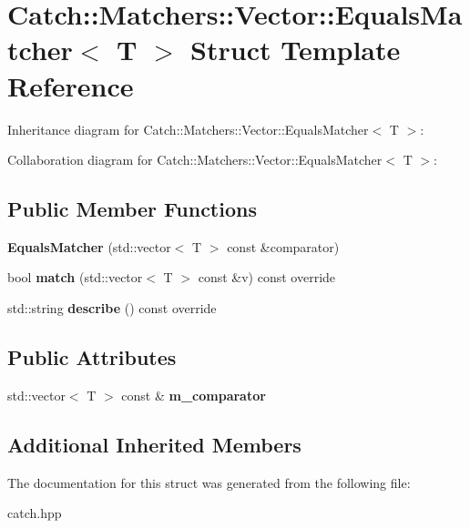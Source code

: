 \hypertarget{structCatch_1_1Matchers_1_1Vector_1_1EqualsMatcher}{}\section{Catch\+:\+:Matchers\+:\+:Vector\+:\+:Equals\+Matcher$<$ T $>$ Struct Template Reference}
\label{structCatch_1_1Matchers_1_1Vector_1_1EqualsMatcher}


Inheritance diagram for Catch\+:\+:Matchers\+:\+:Vector\+:\+:Equals\+Matcher$<$ T $>$\+:


Collaboration diagram for Catch\+:\+:Matchers\+:\+:Vector\+:\+:Equals\+Matcher$<$ T $>$\+:
\subsection*{Public Member Functions}
\begin{DoxyCompactItemize}
\item 
\mbox{\label{structCatch_1_1Matchers_1_1Vector_1_1EqualsMatcher_a3846c47780d1991dcfe87aefded98008}} 
{\bfseries Equals\+Matcher} (std\+::vector$<$ T $>$ const \&comparator)
\item 
\mbox{\label{structCatch_1_1Matchers_1_1Vector_1_1EqualsMatcher_a2d96cca58a44151fddc5257eda3305da}} 
bool {\bfseries match} (std\+::vector$<$ T $>$ const \&v) const override
\item 
\mbox{\label{structCatch_1_1Matchers_1_1Vector_1_1EqualsMatcher_a36b5f7ecada4081d6c65bebe8ddea6f4}} 
std\+::string {\bfseries describe} () const override
\end{DoxyCompactItemize}
\subsection*{Public Attributes}
\begin{DoxyCompactItemize}
\item 
\mbox{\label{structCatch_1_1Matchers_1_1Vector_1_1EqualsMatcher_a56f7aa6f110a12b1b9aeb0cabbc9d755}} 
std\+::vector$<$ T $>$ const  \& {\bfseries m\+\_\+comparator}
\end{DoxyCompactItemize}
\subsection*{Additional Inherited Members}


The documentation for this struct was generated from the following file\+:\begin{DoxyCompactItemize}
\item 
catch.\+hpp\end{DoxyCompactItemize}
